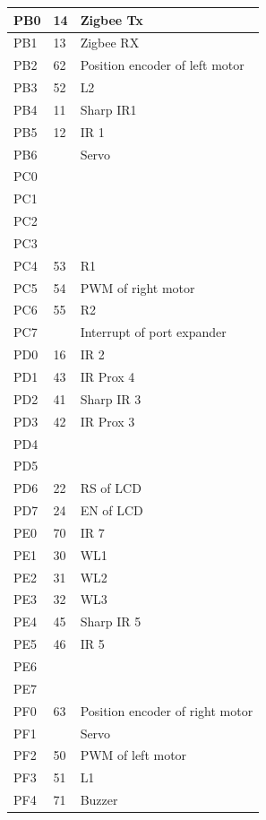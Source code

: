 \documentclass[a4paper,10pt,oneside]{article}
\begin{document}
{\begin{longtable}{|p{}|p{}|p{}|}
			PB0&	14&	Zigbee Tx\\ \hline
			PB1&	13&	Zigbee RX\\ \hline
			PB2&	62&	Position encoder of left motor\\ \hline
			PB3&	52&	L2\\ \hline
			PB4&	11&	Sharp IR1\\ \hline
			PB5&	12&	IR 1\\ \hline
			PB6&	&	Servo\\ \hline
			PC0	&	&\\ \hline
			PC1&	&	\\ \hline
			PC2&	&	\\ \hline
			PC3&	&	\\ \hline
			PC4&	53&	R1\\ \hline
			PC5&	54&	PWM of right motor\\ \hline
			PC6&	55&	R2\\ \hline
			PC7&	&	Interrupt of port expander\\ \hline
			
			PD0	&16	&IR 2\\ \hline
			PD1&	43&	IR Prox 4\\ \hline
			PD2&	41&	Sharp IR 3\\ \hline
			PD3&	42&	IR Prox 3\\ \hline
			PD4&	&	\\ \hline
			PD5&	&	\\ \hline
			PD6&	22&	RS of LCD\\ \hline
			PD7&	24&	EN of LCD\\ \hline
			
			PE0&	70&IR 7\\ \hline
			PE1&	30&	WL1\\ \hline
			PE2&	31&	WL2\\ \hline
			PE3&	32&	WL3\\ \hline
			PE4&	45&	Sharp IR 5\\ \hline
			PE5&	46&	IR 5\\ \hline
			PE6&	&\\ \hline
			PE7&	&	\\ \hline
			
			PF0&	63&	Position encoder of right motor\\ \hline
			PF1&	&	Servo\\ \hline
			PF2&	50&	PWM of left motor\\ \hline
			PF3&	51	&L1\\ \hline
			PF4&	71&	Buzzer\\ \hline
			

\end{longtable}}
\end{document}
